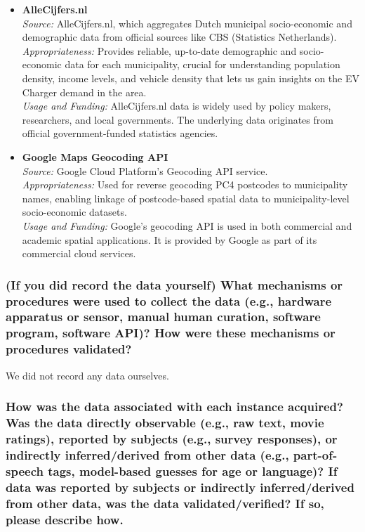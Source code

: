 \documentclass{article}
\newcommand{\question}[1]{#1}
\begin{document}
\begin{itemize}
	\item \textbf{AlleCijfers.nl} \\
	      \textit{Source:} AlleCijfers.nl, which aggregates Dutch municipal socio-economic and demographic data from official sources like CBS (Statistics Netherlands). \\
	      \textit{Appropriateness:} Provides reliable, up-to-date demographic and socio-economic data for each municipality, crucial for understanding population density, income levels, and vehicle density that lets us gain insights on the EV Charger demand in the area. \\
	      \textit{Usage and Funding:} AlleCijfers.nl data is widely used by policy makers, researchers, and local governments. The underlying data originates from official government-funded statistics agencies.

	\item \textbf{Google Maps Geocoding API} \\
	      \textit{Source:} Google Cloud Platform’s Geocoding API service. \\
	      \textit{Appropriateness:} Used for reverse geocoding PC4 postcodes to municipality names, enabling linkage of postcode-based spatial data to municipality-level socio-economic datasets. \\
	      \textit{Usage and Funding:} Google’s geocoding API is used in both commercial and academic spatial applications. It is provided by Google as part of its commercial cloud services.
\end{itemize}

\question{\subsubsection*{(If you did record the data yourself) What mechanisms or procedures were used to collect the data (e.g.,
		hardware apparatus or sensor, manual human curation, software program, software API)? How were these mechanisms or procedures validated?}}
We did not record any data ourselves.

\question{\subsubsection*{How was the data associated with each instance acquired? Was the
		data directly observable (e.g., raw text, movie ratings), reported by subjects (e.g., survey responses), or indirectly inferred/derived from other data
		(e.g., part-of-speech tags, model-based guesses for age or language)?
		If data was reported by subjects or indirectly inferred/derived from other
		data, was the data validated/verified? If so, please describe how.}}
\end{document}
